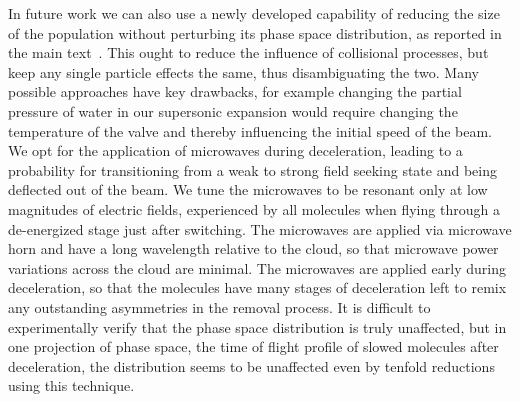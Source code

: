 \documentclass[%
 reprint,
 amsmath,amssymb,
 aps,
prl,
]{revtex4-1}
\begin{document}

In future work we can also use a newly developed capability of reducing the size of the population without perturbing its phase space distribution, as reported in the main text~\cite{smt}.
This ought to reduce the influence of collisional processes, but keep any single particle effects the same, thus disambiguating the two.
Many possible approaches have key drawbacks, for example changing the partial pressure of water in our supersonic expansion would require changing the temperature of the valve and thereby influencing the initial speed of the beam.
We opt for the application of microwaves during deceleration, leading to a probability for transitioning from a weak to strong field seeking state and being deflected out of the beam.
We tune the microwaves to be resonant only at low magnitudes of electric fields, experienced by all molecules when flying through a de-energized stage just after switching.
The microwaves are applied via microwave horn and have a long wavelength relative to the cloud, so that microwave power variations across the cloud are minimal.
The microwaves are applied early during deceleration, so that the molecules have many stages of deceleration left to remix any outstanding asymmetries in the removal process.
It is difficult to experimentally verify that the phase space distribution is truly unaffected, but in one projection of phase space, the time of flight profile of slowed molecules after deceleration, the distribution seems to be unaffected even by tenfold reductions using this technique.
\end{document}
